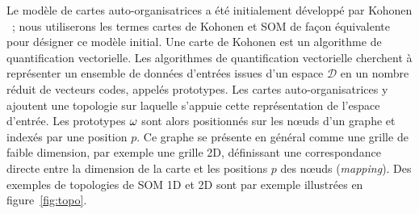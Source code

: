 \documentclass[../main]{subfiles}
\begin{document}
Le modèle de cartes auto-organisatrices a été initialement développé par Kohonen \parencite{Kohonen1982}~; nous utiliserons les termes cartes de Kohonen et SOM de façon équivalente pour désigner ce modèle initial.
Une carte de Kohonen est un algorithme de quantification vectorielle. 
Les algorithmes de quantification vectorielle cherchent à représenter un ensemble de données d'entrées issues d'un espace $\mathcal{D}$ en un nombre réduit de vecteurs codes, appelés prototypes.
Les cartes auto-organisatrices y ajoutent une topologie sur laquelle s'appuie cette représentation de l'espace d'entrée. 
Les prototypes $\omega$ sont alors positionnés sur les n\oe{}uds d'un graphe et indexés par une position $p$. Ce graphe se présente en général comme une grille de faible dimension, par exemple une grille 2D, définissant une correspondance directe entre la dimension de la carte et les positions $p$ des n\oe{}uds
(\emph{mapping}). 
Des exemples de topologies de SOM 1D et 2D sont par exemple illustrées en figure~\ref{fig:topo}.
\end{document}
